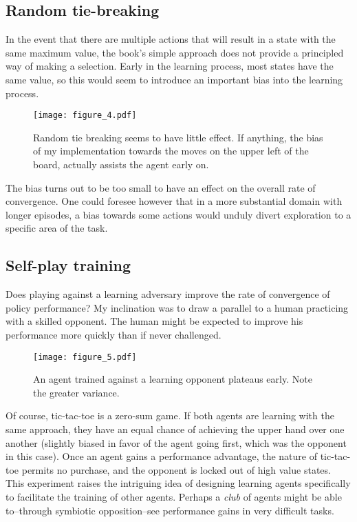\documentclass{article}
\begin{document}
		
	\subsection{Random tie-breaking}
	
	In the event that there are multiple actions that will result in a state with the same maximum value, the book's simple approach does not provide a principled way of making a selection. Early in the learning process, most states have the same value, so this would seem to introduce an important bias into the learning process.
	
		\begin{figure}[h]
			\begin{center}
				\texttt{[image: figure\_4.pdf]}
				\caption{Random tie breaking seems to have little effect. If anything, the bias of my implementation towards the moves on the upper left of the board, actually assists the agent early on.}
			\end{center}
		\end{figure}
		
	The bias turns out to be too small to have an effect on the overall rate of convergence. One could foresee however that in a more substantial domain with longer episodes, a bias towards some actions would unduly divert exploration to a specific area of the task.
	
	\subsection{Self-play training}
	

	Does playing against a learning adversary improve the rate of convergence of policy performance? My inclination was to draw a parallel to a human practicing with a skilled opponent. The human might be expected to improve his performance more quickly than if never challenged. 
	
			\begin{figure}[h]
				\begin{center}
					\texttt{[image: figure\_5.pdf]}
					\caption{An agent trained against a learning opponent plateaus early. Note the greater variance.}
				\end{center}
			\end{figure}
			
	
	Of course, tic-tac-toe is a zero-sum game. If both agents are learning with the same approach, they have an equal chance of achieving the upper hand over one another (slightly biased in favor of the agent going first, which was the opponent in this case). Once an agent gains a performance advantage, the nature of tic-tac-toe permits no purchase, and the opponent is locked out of high value states. This experiment raises the intriguing idea of designing learning agents specifically to facilitate the training of other agents. Perhaps a \textit{club} of agents might be able to--through symbiotic opposition--see performance gains in very difficult tasks.
\end{document}
